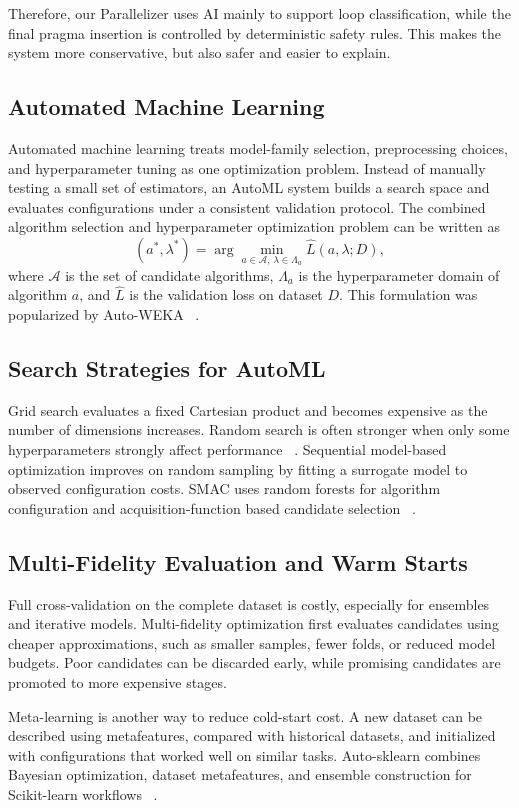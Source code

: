 \documentclass[12pt,a4paper]{report}
\begin{document}
Therefore, our Parallelizer uses AI mainly to support loop classification, while
the final pragma insertion is controlled by deterministic safety rules. This
makes the system more conservative, but also safer and easier to explain.

\subsection{Automated Machine Learning}
Automated machine learning treats model-family selection, preprocessing choices,
and hyperparameter tuning as one optimization problem. Instead of manually
testing a small set of estimators, an AutoML system builds a search space and
evaluates configurations under a consistent validation protocol. The combined
algorithm selection and hyperparameter optimization problem can be written as
\[
  (a^*, \lambda^*) =
  \arg\min_{a \in \mathcal{A},\,\lambda \in \Lambda_a}
  \widehat{L}(a, \lambda; D),
\]
where $\mathcal{A}$ is the set of candidate algorithms, $\Lambda_a$ is the
hyperparameter domain of algorithm $a$, and $\widehat{L}$ is the validation
loss on dataset $D$. This formulation was popularized by Auto-WEKA
~\cite{autoweka}.

\subsection{Search Strategies for AutoML}
Grid search evaluates a fixed Cartesian product and becomes expensive as the
number of dimensions increases. Random search is often stronger when only some
hyperparameters strongly affect performance ~\cite{randomsearch}. Sequential
model-based optimization improves on random sampling by fitting a surrogate
model to observed configuration costs. SMAC uses random forests for algorithm
configuration and acquisition-function based candidate selection ~\cite{smac}.

\subsection{Multi-Fidelity Evaluation and Warm Starts}
Full cross-validation on the complete dataset is costly, especially for
ensembles and iterative models. Multi-fidelity optimization first evaluates
candidates using cheaper approximations, such as smaller samples, fewer folds,
or reduced model budgets. Poor candidates can be discarded early, while
promising candidates are promoted to more expensive stages.

Meta-learning is another way to reduce cold-start cost. A new dataset can be
described using metafeatures, compared with historical datasets, and initialized
with configurations that worked well on similar tasks. Auto-sklearn combines
Bayesian optimization, dataset metafeatures, and ensemble construction for
Scikit-learn workflows ~\cite{autosklearn}.
\end{document}
